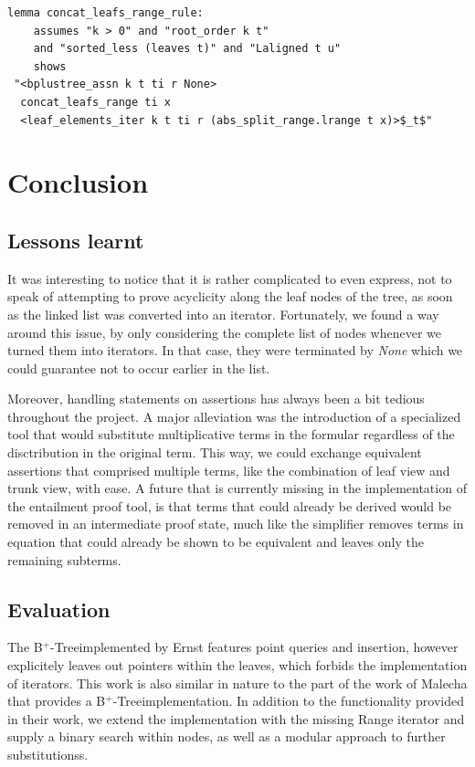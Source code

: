 \documentclass[a4paper,UKenglish,cleveref, autoref, thm-restate]{lipics-v2021}
\newcommand{\btree}{B$^+$-Tree}
\begin{document}
\begin{lstlisting}[mathescape=true, language=Isabelle,label=lst:btree-leafs-range]
lemma concat_leafs_range_rule:
    assumes "k > 0" and "root_order k t" 
    and "sorted_less (leaves t)" and "Laligned t u"
    shows 
 "<bplustree_assn k t ti r None>
  concat_leafs_range ti x
  <leaf_elements_iter k t ti r (abs_split_range.lrange t x)>$_t$"
\end{lstlisting}



\section{Conclusion}
\label{sec:conclusion}

\subsection{Lessons learnt}

It was interesting to notice that it is rather complicated
to even express, not to speak of attempting to prove acyclicity
 along the leaf nodes of the tree, as soon as the linked list was converted into an iterator.
Fortunately, we found a way around this issue, by only considering
the complete list of nodes whenever we turned them into
iterators. In that case, they were terminated by \textit{None}
which we could guarantee not to occur earlier in the list.

Moreover, handling statements on assertions has always been
a bit tedious throughout the project.
A major alleviation was the introduction of a specialized tool
that would substitute multiplicative terms in the formular
regardless of the disctribution in the original term.
This way, we could exchange equivalent assertions that comprised
multiple terms, like the combination of leaf view and trunk view,
with ease.
A future that is currently missing in the implementation of the entailment
proof tool, is that terms that could already be derived
would be removed in an intermediate proof state,
much like the simplifier removes terms in equation that could
already be shown to be equivalent and leaves only the remaining subterms.

\subsection{Evaluation}


The \btree implemented by Ernst features point queries and insertion,
however explicitely leaves out pointers within the leaves,
which forbids the implementation of iterators.
This work is also similar in nature to the part of the work of Malecha
that provides a \btree implementation.
In addition to the functionality provided in their work, we extend
the implementation with the missing Range iterator
and supply a binary search within nodes, as well as a modular approach
to further substitutionss.
\end{document}
